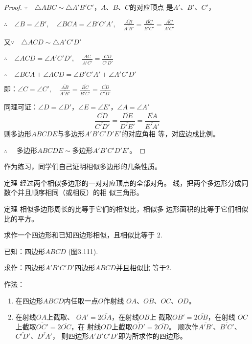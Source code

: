 \begin{proof}
$\because\quad \triangle ABC\sim \triangle A'B'C'$，$A$、$B$、$C$的对应顶点
是$A'$、$B'$、$C'$，

$\therefore\quad \angle B=\angle B',\quad \angle BCA=\angle B'C'A',\quad  \frac{\overline{AB}}{\overline{A'B'}}=\frac{\overline{BC}}{\overline{B'C'}}=\frac{\overline{AC}}{\overline{A'C'}}$

又$\because\quad \triangle ACD\sim \triangle A'C'D'$

$\therefore\quad \angle ACD=\angle A'C'D',\quad \frac{\overline{AC}}{\overline{A'C'}}=\frac{\overline{CD}}{\overline{C'D'}}$

$\therefore\quad \angle BCA+\angle ACD=\angle B'C'A'+\angle A'C'D'$

即：$\angle C=\angle C',\quad \frac{\overline{AB}}{\overline{A'B'}}=\frac{\overline{BC}}{\overline{B'C'}}=\frac{\overline{CD}}{\overline{C'D'}}$

同理可证：$\angle D=\angle D'$，$\angle E=\angle E'$，$\angle A=\angle A'$
\[\frac{\overline{CD}}{\overline{C'D'}}=\frac{\overline{DE}}{\overline{D'E'}}=\frac{\overline{EA}}{\overline{E'A'}}\]
则多边形$ABCDE$与多边形$A'B'C'D'E'$的对应角相
等，对应边成比例。

$\therefore\quad$ 多边形$ABCDE\sim $多边形$A'B'C'D'E'$。
\end{proof}

作为练习，同学们自己证明相似多边形的几条性质。
\begin{Theorem}{定理} 
经过两个相似多边形的一对对应顶点的全部对角。
线，把两个多边形分成同数个并且顺序相同（或相反）的相
似三角形。
\end{Theorem}

\begin{Theorem}
   {定理} 相似多边形周长的比等于它们的相似比，相似多
边形面积的比等于它们相似比的平方。 
\end{Theorem}

\begin{example}
    求作一个四边形和已知四边形相似，且相似比等于
    2.

    已知：四边形$ABCD$ (图3.111).

    求作：四边形$A'B'C'D'$四边形$ABCD$并且相似比
等于2.

作法：
\begin{enumerate}
    \item 在四边形$ABCD$内任取一点$O$作射线
$OA$、$OB$、$OC$、$OD$。
\item 在射线$OA$上截取、
$\overline{OA'}=2\overline{OA}$，在射线$OB$上
截取$\overline{OB'}=2\overline{OB}$，在射线
$OC$上截取$\overline{OC'}=2\overline{OC}$，在
射线$OD$上截取$\overline{OD'}=2\overline{OD}$。
顺次作$\overline{A'B'}$、$\overline{B'C'}$、$\overline{C'D'}$、$\overline{D'A'}$，
则四边形$A'B'C'D'$即为所求作的四边形。
\end{enumerate}
\end{example}

